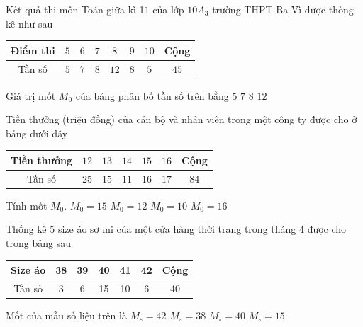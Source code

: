 \begin{ex}%
	Kết quả thi môn Toán giữa kì 1$1$  của lớp $10A_3$ trường THPT Ba Vì được thống kê như sau
	\begin{center}
		\begin{tabular}{|c|c|c|c|c|c|c|c|}
			\hline Điểm thi &  $5$ & $6$ & $7$ & $8$ & $9$ & $10$ & Cộng\\
			\hline Tần số & $5$ & $7$  & $8$ & $12$ & $8$ & $5$ & $45$\\
			 \hline
		\end{tabular}
	\end{center}
	Giá trị mốt $M_0$ của bảng phân bố tần số  trên bằng
	 \choice
		{$5$} 
		 {$7$}
		{\True  $8$}
		 {$12$}
\end{ex}

\begin{ex}%
	Tiền thưởng (triệu đồng) của cán bộ và nhân viên trong một công  ty được cho ở bảng dưới đây
	\begin{center}
		\begin{tabular}{|c|c|c|c|c|c|c|}
			\hline Tiền thưởng & $12$ & $13$  & $14$ & $15$ & $16$ & Cộng\\
			\hline Tần số & $25$ & $15$  & $11$ & $16$ & $17$ & $84$\\
			 \hline
		\end{tabular}
	\end{center}
	Tính  mốt $M_0$.
	\choice 
		 {$M_0=15$}
		 {\True $M_0=12$}
		 {$M_0=10$}
		{$M_0=16$} 
\end{ex}

\begin{ex}%
	Thống kê $5$ size áo sơ mi của một cửa hàng thời trang trong tháng $4$ được cho trong  bảng sau
	\begin{center}
		\begin{tabular}{|c|c|c|c|c|c|c|}
			\hline Size áo & 38 & 39 & 40 &  41 & 42 & Cộng \\
			\hline Tần số & 3 & 6 & 15 &  10 & 6 & 40 \\
			 \hline
		\end{tabular}
	\end{center}
	Mốt của  mẫu số liệu trên là
	\choice 
		 {$M_\circ=42$}
		{$M_\circ=38$} 
		{\True $M_\circ=40$} 
		 {$M_\circ=15$}
\end{ex}


